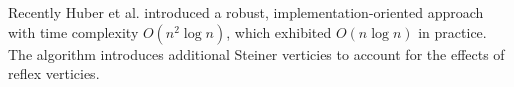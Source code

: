 Recently Huber et al. introduced a robust, implementation-oriented approach with time complexity $O(n^2 \log n)$, which exhibited $O(n \log n)$ in practice. The algorithm introduces additional Steiner verticies to account for the effects of reflex verticies.

